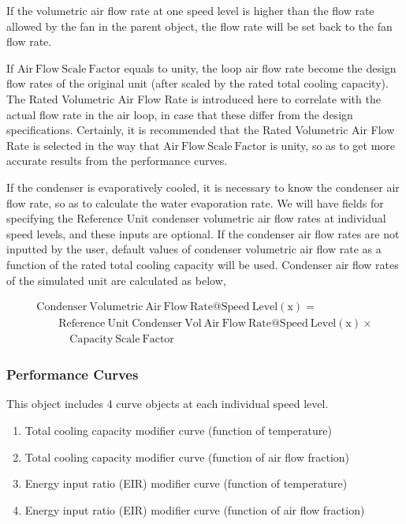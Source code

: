 If the volumetric air flow rate at one speed level is higher than the flow rate allowed by the fan in the parent object, the flow rate will be set back to the fan flow rate.

If \({\mathrm{Air~Flow~Scale~Factor}}\) equals to unity, the loop air flow rate become the design flow rates of the original unit (after scaled by the rated total cooling capacity). The Rated Volumetric Air Flow Rate is introduced here to correlate with the actual flow rate in the air loop, in case that these differ from the design specifications. Certainly, it is recommended that the Rated Volumetric Air Flow Rate is selected in the way that \({\mathrm{Air~Flow~Scale~Factor}}\) is unity, so as to get more accurate results from the performance curves.

If the condenser is evaporatively cooled, it is necessary to know the condenser air flow rate, so as to calculate the water evaporation rate. We will have fields for specifying the Reference Unit condenser volumetric air flow rates at individual speed levels, and these inputs are optional. If the condenser air flow rates are not inputted by the user, default values of condenser volumetric air flow rate as a function of the rated total cooling capacity will be used. Condenser air flow rates of the simulated unit are calculated as below,

\begin{equation}
  \begin{array}{l}
    \mathrm{Condenser~Volumetric~Air~Flow~Rate} @ \mathrm{Speed~Level} \left( {\mathrm{x}} \right) = \\
    \quad \quad \mathrm{Reference~Unit~Condenser~Vol~Air~Flow~Rate} @ \mathrm{Speed~Level} (\mathrm{x}) \times \\
    \quad \quad \quad \mathrm{Capacity~Scale~Factor}
  \end{array}
\end{equation}

\subsubsection{Performance Curves}\label{performance-curves}

This object includes 4 curve objects at each individual speed level.

\begin{enumerate}
\def\labelenumi{\arabic{enumi})}
\tightlist
\item Total cooling capacity modifier curve (function of temperature)
\item Total cooling capacity modifier curve (function of air flow fraction)
\item Energy input ratio (EIR) modifier curve (function of temperature)
\item Energy input ratio (EIR) modifier curve (function of air flow fraction)
\end{enumerate}

